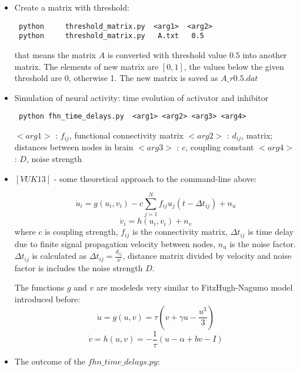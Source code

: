 \documentclass{article}
\begin{document}
\begin{itemize}
\item Create a matrix with threshold: 
 \begin{lstlisting}
 python		threshold_matrix.py  <arg1>  <arg2>
 python		threshold_matrix.py   A.txt   0.5
 \end{lstlisting}
that means the matrix $A$ is converted with threshold value $0.5$ into another matrix. The elements of new matrix are $[0,1]$, the values below the given threshold are 0, otherwise 1. The new matrix is saved as $A\_r0.5.dat$ 

\item Simulation of neural activity: time evolution of activator and inhibitor
 \begin{lstlisting}
 python	fhn_time_delays.py  <arg1> <arg2> <arg3> <arg4>
 \end{lstlisting}
$<arg1>$ : $f_{ij}$, functional connectivity matrix \newline
$<arg2>$ : $d_{ij}$, matrix;  distances between nodes in brain \newline
$<arg3>$ : $c$, coupling constant \newline
$<arg4>$ : $D$, noise strength 

\item $[VUK13]$ - some theoretical approach to the command-line above:
 
\begin{equation}
 \dot{u}_i=g(u_i,v_i)-c \sum_{j=1}^N  f_{ij} u_j(t-\Delta t_{ij})+n_u
\end{equation}
\begin{equation}
 \dot{v}_i=h(u_i,v_i)+n_v
\end{equation}
where $c$ is coupling strength, $f_{ij}$ is the connectivity matrix, $\Delta t_{ij}$ is time delay due to finite signal propagation velocity between nodes, $n_u$ is the noise factor. $\Delta t_{ij}$ is calculated as $\Delta t_{ij}=\frac{d_{ij}}{\nu}$, distance matrix divided by velocity and noise factor is includes the noise strength $D$. 

The functions $g$ and $v$ are modeleds very similar to FitzHugh-Nagumo model introduced before:
\begin{equation}
 \dot{u}=g(u,v)=\tau(v+\gamma u - \frac{u^3}{3})
\end{equation}
\begin{equation}
 \dot{v}=h(u,v)=-\frac{1}{\tau}(u- \alpha +bv-I)
\end{equation}

\item The outcome of the $fhn\_time\_delays.py$:


\end{itemize}
\end{document}
